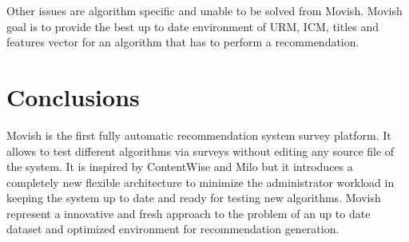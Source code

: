 Other issues are algorithm specific and unable to be solved from Movish. Movish goal is to provide the best up to date environment of \ac{URM}, \ac{ICM}, titles and features vector for an algorithm that has to perform a recommendation. 

\section{Conclusions}
\label{sec:movish_conclusions}

Movish is the first fully automatic recommendation system survey platform. It allows to test different algorithms via surveys without editing any source file of the system. It is inspired by ContentWise and Milo but it introduces a completely new flexible architecture to minimize the administrator workload in keeping the system up to date and ready for testing new algorithms. Movish represent a innovative and fresh approach to the problem of an up to date dataset and optimized environment for recommendation generation.

\acresetall